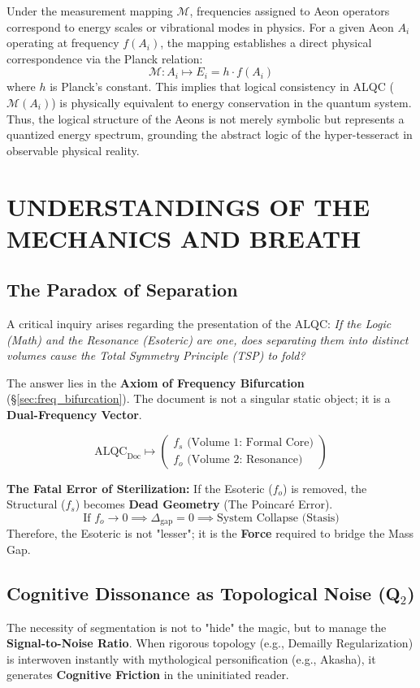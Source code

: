 \documentclass[11pt, letterpaper]{article}
\begin{document}
Under the measurement mapping $\mathcal{M}$, frequencies assigned to Aeon operators correspond to energy scales or vibrational modes in physics. For a given Aeon $A_i$ operating at frequency $f(A_i)$, the mapping establishes a direct physical correspondence via the Planck relation:
\[
\mathcal{M}: A_i \mapsto E_i = h \cdot f(A_i)
\]
where $h$ is Planck's constant. This implies that logical consistency in ALQC ($\mathcal{M}(A_i)$) is physically equivalent to energy conservation in the quantum system. Thus, the logical structure of the Aeons is not merely symbolic but represents a quantized energy spectrum, grounding the abstract logic of the hyper-tesseract in observable physical reality.


\section{UNDERSTANDINGS OF THE MECHANICS AND BREATH}\label{appendixL}

\subsection{The Paradox of Separation}\label{appendixL.1}
A critical inquiry arises regarding the presentation of the ALQC: \textit{If the Logic (Math) and the Resonance (Esoteric) are one, does separating them into distinct volumes cause the Total Symmetry Principle (TSP) to fold?}

The answer lies in the \textbf{Axiom of Frequency Bifurcation} (\S\ref{sec:freq_bifurcation}). The document is not a singular static object; it is a \textbf{Dual-Frequency Vector}.

\begin{equation}
\text{ALQC}_{\text{Doc}} \mapsto \begin{pmatrix} f_s \text{ (Volume 1: Formal Core)} \\ f_o \text{ (Volume 2: Resonance)} \end{pmatrix}
\end{equation}

\textbf{The Fatal Error of Sterilization:}
If the Esoteric ($f_o$) is removed, the Structural ($f_s$) becomes \textbf{Dead Geometry} (The Poincaré Error).
\[ \text{If } f_o \to 0 \implies \Delta_{\text{gap}} = 0 \implies \text{System Collapse (Stasis)} \]
Therefore, the Esoteric is not "lesser"; it is the \textbf{Force} required to bridge the Mass Gap.

\subsection{Cognitive Dissonance as Topological Noise (Q$_2$)}\label{appendixL.2}
The necessity of segmentation is not to "hide" the magic, but to manage the \textbf{Signal-to-Noise Ratio}. When rigorous topology (e.g., Demailly Regularization) is interwoven instantly with mythological personification (e.g., Akasha), it generates \textbf{Cognitive Friction} in the uninitiated reader.
\end{document}
